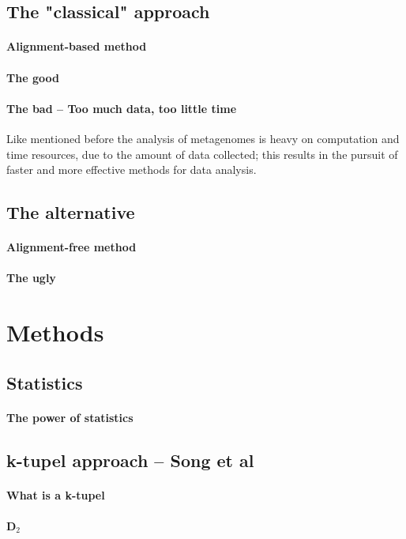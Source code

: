 \documentclass[twocolumn]{bmcart}%
\begin{document}
\subsection*{The "classical" approach}
\paragraph*{Alignment-based method}

\paragraph*{The good}
\paragraph*{The bad -- Too much data, too little time}
Like mentioned before the analysis of metagenomes is heavy on computation and time resources, due to the amount of data collected; this results in the pursuit of faster and more effective methods for data analysis.
\subsection*{The alternative}
\paragraph*{Alignment-free method}
\paragraph*{The ugly}
\section*{Methods}
\subsection*{Statistics}
\paragraph*{The power of statistics}
\subsection*{k-tupel approach -- Song et al}
\paragraph*{What is a k-tupel}
\paragraph*{D$_2$}
\end{document}
